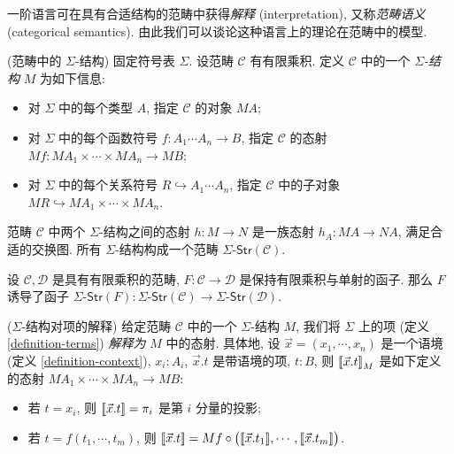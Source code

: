 一阶语言可在具有合适结构的范畴中获得\emph{解释} (interpretation), 又称\emph{范畴语义} (categorical semantics).
由此我们可以谈论这种语言上的理论在范畴中的模型.

\begin{definition}
	[label={sigma-structures-in-category}]
	{(范畴中的 $\Sigma$-结构)}
	固定符号表 $\Sigma$. 设范畴 $\mathcal C$ 有有限乘积.
	定义 $\mathcal C$ 中的一个 \emph{$\Sigma$-结构} $M$ 为如下信息:
	\begin{itemize}
		\item 对 $\Sigma$ 中的每个类型 $A$, 指定 $\mathcal C$ 的对象 $MA$;
		\item 对 $\Sigma$ 中的每个函数符号 $f\colon A_1\cdots A_n \to B$, 指定 $\mathcal C$ 的态射
		$Mf \colon MA_1\times\cdots\times MA_n \to MB$;
		\item 对 $\Sigma$ 中的每个关系符号 $R \hookrightarrow A_1\cdots A_n$, 指定 $\mathcal C$ 中的子对象
		$MR \hookrightarrow MA_1\times\cdots\times MA_n$.
	\end{itemize}
	
	范畴 $\mathcal C$ 中两个 $\Sigma$-结构之间的态射 $h\colon M\to N$ 是一族态射 $h_A \colon MA \to NA$, 满足合适的交换图. 所有 $\Sigma$-结构构成一个范畴 $\Sigma\text{-}\mathsf{Str}(\mathcal C)$.
	
\end{definition}

\begin{prop}
	{}
	设 $\mathcal C,\mathcal D$ 是具有有限乘积的范畴,
	$F \colon \mathcal C \to \mathcal D$ 是保持有限乘积与单射的函子. 那么 $F$ 诱导了函子
	$\Sigma\text{-}\mathsf{Str}(F)\colon \Sigma\text{-}\mathsf{Str}(\mathcal C) \to \Sigma\text{-}\mathsf{Str}(\mathcal D)$.
\end{prop}


\begin{definition}
	[label={term-interpretation}]
	{($\Sigma$-结构对项的解释)}
	给定范畴 $\mathcal C$ 中的一个 $\Sigma$-结构 $M$, 我们将 $\Sigma$ 上的项 (定义 \ref{definition-terms}) \emph{解释为} $M$ 中的态射.
	具体地, 设 $\vec x = (x_1,\cdots,x_n)$ 是一个语境 (定义 \ref{definition-context}), $x_i\colon A_i$,
	$\vec x.t$ 是带语境的项, $t\colon B$, 则 ${[\![\vec x.t]\!]}_M$ 是如下定义的态射 $MA_1\times\cdots\times MA_n\to MB$:
	\begin{itemize}
		\item 若 $t=x_i$, 则 ${[\![\vec x.t]\!]} = \pi_i$ 是第 $i$ 分量的投影;
		\item 若 $t = f(t_1,\cdots,t_m)$, 则
		${[\![\vec x.t]\!]} = Mf \circ \big({[\![\vec x.t_1]\!]},\cdots,{[\![\vec x.t_m]\!]}\big)$.
	\end{itemize}
\end{definition}

